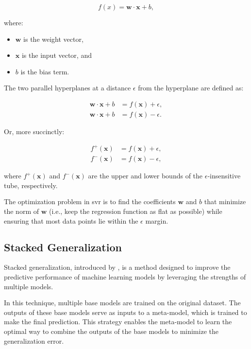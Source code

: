 $$
f(x) = \mathbf{w} \cdot \mathbf{x} + b,
$$

where:

\begin{itemize}
	\item $\mathbf{w}$ is the weight vector,
	\item $\mathbf{x}$ is the input vector, and
	\item $b$ is the bias term.
\end{itemize}

The two parallel hyperplanes at a distance $\epsilon$ from the hyperplane are defined as:

$$
\begin{aligned}
    \mathbf{w} \cdot \mathbf{x} + b &= f(\mathbf{x}) + \epsilon, \\
    \mathbf{w} \cdot \mathbf{x} + b &= f(\mathbf{x}) - \epsilon.
\end{aligned}
$$

Or, more succinctly:

$$
\begin{aligned}
    f^+(\mathbf{x}) &= f(\mathbf{x}) + \epsilon, \\
    f^-(\mathbf{x}) &= f(\mathbf{x}) - \epsilon,
\end{aligned}
$$

where $f^+(\mathbf{x})$ and $f^-(\mathbf{x})$ are the upper and lower bounds of the $\epsilon$-insensitive tube, respectively.

The optimization problem in \gls{svr} is to find the coefficients $\mathbf{w}$ and $b$ that minimize the norm of $\mathbf{w}$ (i.e., keep the regression function as flat as possible) while ensuring that most data points lie within the $\epsilon$ margin.

\subsection{Stacked Generalization}
Stacked generalization, introduced by \citet{wolpertstacked_1992}, is a method designed to improve the predictive performance of machine learning models by leveraging the strengths of multiple models.

In this technique, multiple base models are trained on the original dataset. 
The outputs of these base models serve as inputs to a meta-model, which is trained to make the final prediction.
This strategy enables the meta-model to learn the optimal way to combine the outputs of the base models to minimize the generalization error.

